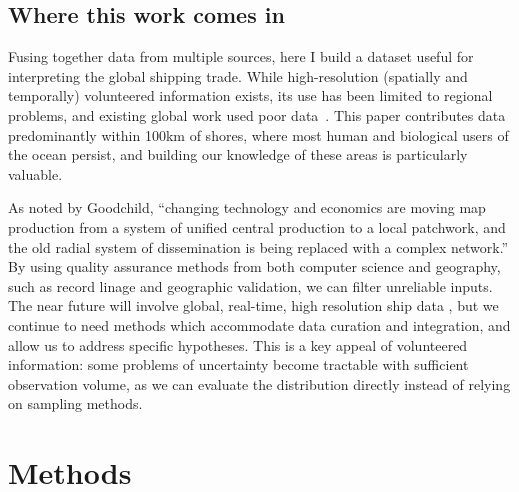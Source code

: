 \documentclass[12pt,letterpaper]{article}
\begin{document}
\subsection{Where this work comes in}

Fusing together data from multiple sources, here I build a dataset useful for interpreting the global shipping trade. While high-resolution (spatially and temporally) volunteered information exists, its use has been limited to regional problems, and existing global work used poor data~\citep{Corbett2007, Halpern2008}. This paper contributes data predominantly within 100km of shores, where most human and biological users of the ocean persist, and building our knowledge of these areas is particularly valuable.

As noted by Goodchild, ``changing technology and economics are moving map production from a system of unified central production to a local patchwork, and the old radial system of dissemination is being replaced with a complex network.''\citep{goodchild1999cartographic} By using quality assurance methods from both computer science and geography, such as record linage and geographic validation, we can filter unreliable inputs. The near future will involve global, real-time, high resolution ship data \citep{JonesGoogle2012,carson2012satellite}, but we continue to need methods which accommodate data curation and integration, and allow us to address specific hypotheses. This is a key appeal of volunteered information: some problems of uncertainty become tractable with sufficient observation volume, as we can evaluate the distribution directly instead of relying on sampling methods.



\section{\textbf{Methods}}
\end{document}
